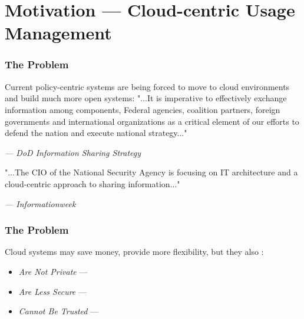 \section{Motivation --- Cloud-centric Usage Management}


\begin{frame}
\frametitle{The Problem}
Current policy-centric systems are being forced to move to cloud environments and build much more open systems:
\newline
\newline
\newline
"...It is imperative to  effectively exchange information among components, Federal agencies, coalition partners, foreign governments and international organizations as a critical element of our efforts to defend the nation and execute national strategy..."\cite{proposal:info-sharing-strategy}
\newline
\begin{footnotesize}\textit{--- DoD Information Sharing Strategy}\end{footnotesize}
\newline
\newline
\newline
"...The CIO of the National Security Agency is focusing on IT architecture and a cloud-centric approach to sharing information..."\cite{proposal:nsa-cloud}
\newline
\begin{footnotesize}\textit{--- Informationweek}\end{footnotesize}
\end{frame}

\begin{frame}
\frametitle{The Problem}
Cloud systems may save money, provide more flexibility, but they also \cite{proposal:privacy-security-trust-cloud}:
\begin{itemize}
\item \textit{Are Not Private} ---
\item \textit{Are Less Secure} ---
\item \textit{Cannot Be Trusted} ---
\end{itemize}
\end{frame}
